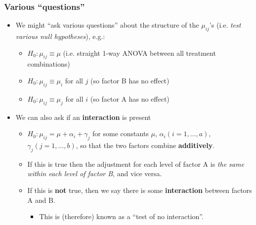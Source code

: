 \documentclass[a4paper]{article}\usepackage[]{graphicx}\usepackage[]{xcolor}
\begin{document}
\subsubsection{Various ``questions''}
\begin{itemize}
	\item We might ``ask various questions'' about the structure of the \( \mu_{ij} \)'s (i.e. \textit{test various null hypotheses}), e.g.:
	\begin{itemize}
		\item \( H_0: \mu_{ij}\equiv\mu \) (i.e. straight 1-way ANOVA between all treatment combinations)
		\item \( H_0: \mu_{ij}\equiv\mu_i \) for all \( j \) (so factor B has no effect)
		\item \( H_0: \mu_{ij}\equiv\mu_j \) for all \( i \) (so factor A has no effect)
	\end{itemize}
	\item We can also ask if an \textbf{interaction} is present
	\begin{itemize}
		\item \( H_0: \mu_{ij}=\mu+\alpha_i+\gamma_j \) for some constants \( \mu \), \( \alpha_i (i=1,\dotsc,a) \), \( \gamma_j(j=1,\dotsc,b) \), so that the two factors combine \textbf{additively}.
		\item If this is true then the adjustment for each level of factor A is \textit{the same within each level of factor B}, and vice versa.
		\item If this is \textbf{not} true, then we say there is some \textbf{interaction} between factors A and B.
		\begin{itemize}
			\item This is (therefore) known as a ``test of no interaction''.
		\end{itemize}
	\end{itemize}
\end{itemize}
\end{document}
